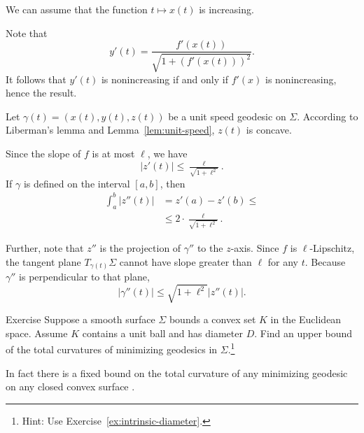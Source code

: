We can assume that the function $t\mapsto x(t)$ is increasing.

Note that 
\[y'(t)=\frac{f'(x(t))}{\sqrt{1+(f'(x(t)))^2}}.\]
It follows that  $y'(t)$ is nonincreasing if and only if $f'(x)$ is nonincreasing, hence the result.
\qeds

Let $\gamma(t)=(x(t),y(t),z(t))$ be a unit speed geodesic on $\Sigma$.
According to Liberman's lemma and Lemma~\ref{lem:unit-speed},
$z(t)$ is concave.

Since the slope of $f$ is at most $\ell$, we have
\[|z'(t)|\le \tfrac{\ell}{\sqrt{1+\ell^2}}.\]
If $\gamma$ is defined on the interval $[a,b]$, then
\begin{align*}
\int_a^b |z''(t)|&=z'(a)-z'(b)\le 
\\
&\le 2\cdot \tfrac{\ell}{\sqrt{1+\ell^2}}.
\end{align*}

Further, note that $z''$ is the projection of $\gamma''$ to the $z$-axis.
Since $f$ is $\ell$-Lipschitz, the tangent plane $T_{\gamma (t)} \Sigma$ cannot have slope greater than $\ell$ for any $t$.
Because $\gamma ''$ is perpendicular to that plane, 
\[  |\gamma '' (t)|  \le \sqrt{1+ \ell ^2} |z''(t)|    .\]

\qeds

\begin{thm}{Exercise} Suppose a smooth surface $\Sigma$ bounds a convex set $K$ in the Euclidean space.
Assume $K$ contains a unit ball and has diameter $D$.
Find an upper bound of the total curvatures of minimizing geodesics in $\Sigma$.\footnote{Hint: Use Exercise~\ref{ex:intrinsic-diameter}.}
\end{thm}

In fact there is a fixed bound on the total curvature of any minimizing geodesic on any closed convex surface \cite{lebedeva-petrunin}.


\warning
